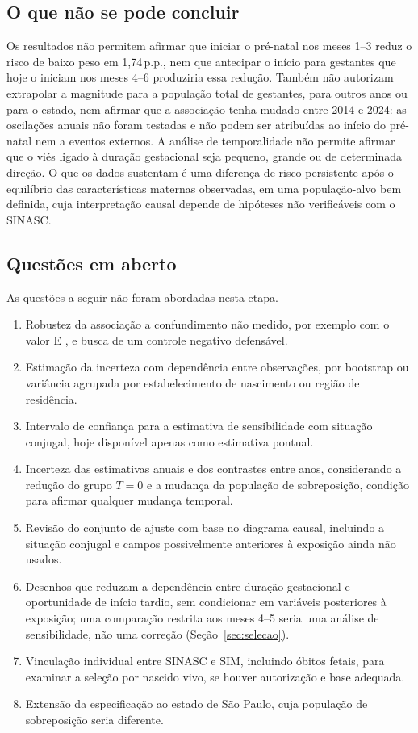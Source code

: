 \documentclass[11pt,a4paper]{article}
\newcommand{\pp}{\,p.p.}
\begin{document}
\subsection{O que não se pode concluir}

Os resultados não permitem afirmar que iniciar o pré-natal nos meses 1--3 reduz o risco de
baixo peso em 1,74\pp, nem que antecipar o início para gestantes que hoje o iniciam nos
meses 4--6 produziria essa redução. Também não autorizam extrapolar a magnitude para a
população total de gestantes, para outros anos ou para o estado, nem afirmar que a
associação tenha mudado entre 2014 e 2024: as oscilações anuais não foram testadas e não
podem ser atribuídas ao início do pré-natal nem a eventos externos. A análise de
temporalidade não permite afirmar que o viés ligado à duração gestacional seja pequeno,
grande ou de determinada direção. O que os dados sustentam
é uma diferença de risco persistente após o equilíbrio das características maternas
observadas, em uma população-alvo bem definida, cuja interpretação causal depende de
hipóteses não verificáveis com o SINASC.

\subsection{Questões em aberto}

As questões a seguir não foram abordadas nesta etapa.
\begin{enumerate}
\item Robustez da associação a confundimento não medido, por exemplo com o valor E
\cite{vanderweele2017}, e busca de um controle negativo defensável.
\item Estimação da incerteza com dependência entre observações, por bootstrap ou
variância agrupada por estabelecimento de nascimento ou região de residência.
\item Intervalo de confiança para a estimativa de sensibilidade com situação conjugal, hoje
disponível apenas como estimativa pontual.
\item Incerteza das estimativas anuais e dos contrastes entre anos, considerando a redução
do grupo $T=0$ e a mudança da população de sobreposição, condição para afirmar qualquer
mudança temporal.
\item Revisão do conjunto de ajuste com base no diagrama causal, incluindo a situação
conjugal e campos possivelmente anteriores à exposição ainda não usados.
\item Desenhos que reduzam a dependência entre duração gestacional e oportunidade de
início tardio, sem condicionar em variáveis posteriores à exposição; uma comparação
restrita aos meses 4--5 seria uma análise de sensibilidade, não uma correção
(Seção~\ref{sec:selecao}).
\item Vinculação individual entre SINASC e SIM, incluindo óbitos fetais, para examinar a
seleção por nascido vivo, se houver autorização e base adequada.
\item Extensão da especificação ao estado de São Paulo, cuja população de sobreposição
seria diferente.
\end{enumerate}

{\small{}}
\end{document}
